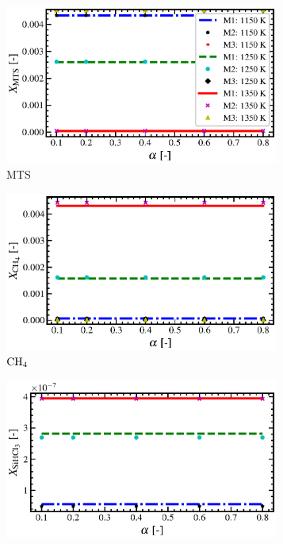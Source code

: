 \documentclass[final, letterpaper, square, comma, numbers, sort&compress]{elsarticle}
\begin{document}
\begin{figure}
    \centering
    \begin{subfigure}{0.49\textwidth}
        \centering
        \includegraphics[width=0.99\textwidth]{dP-vs-MTS-P-5-compare}
        \caption{MTS}
    \end{subfigure}
    \begin{subfigure}{0.49\textwidth}
        \centering
        \includegraphics[width=0.99\textwidth]{dP-vs-CH4-P-5-compare}
        \caption{$\rm CH_4$}
    \end{subfigure}
    \begin{subfigure}{0.49\textwidth}
        \centering
        \includegraphics[width=0.99\textwidth]{dP-vs-SiHCl3-P-5-compare}

\end{subfigure}
\end{figure}
\end{document}
